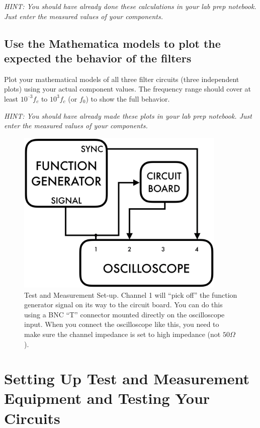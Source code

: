 \documentclass[10pt]{PhysLab1C} %
\begin{document}
\emph{HINT: You should have already done these calculations in your lab
prep notebook. Just enter the measured values of your components.}

\subsection{Use the Mathematica models to plot the expected the behavior of the filters}


Plot your mathematical models of all three filter circuits (three
independent plots) using your actual component values. The frequency
range should cover at least \(10^{–3}  f_c\) to \(10^3 f_c\) (or
\(f_0\)) to show the full behavior.

\emph{HINT: You should have already made these plots in your lab prep
notebook. Just enter the measured values of your components.}

\begin{figure}[h]\centering
    \includegraphics[width=10cm]{lab3fig/equip-setup.png}
    \caption{Test and Measurement Set-up. Channel 1 will ``pick
off'' the function generator signal on its way to the circuit board. You
can do this using a BNC ``T'' connector mounted directly on the
oscilloscope input. When you connect the oscilloscope like this, you
need to make sure the channel impedance is set to high impedance (not $50 \Omega$).}
    \label{setup}
\end{figure}



\section{Setting Up Test and Measurement Equipment and Testing Your Circuits}
\end{document}
